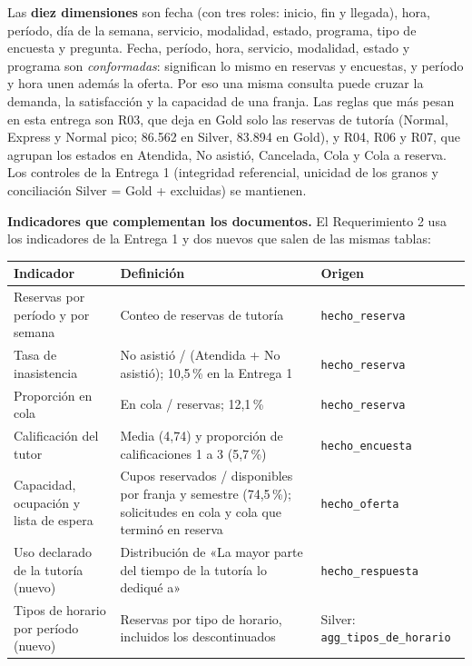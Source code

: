 \documentclass[11pt,letterpaper]{article}
\newcommand{\cod}[1]{\texttt{\small #1}}
\begin{document}
Las \textbf{diez dimensiones} son fecha (con tres roles: inicio, fin y llegada), hora, período, día de la semana, servicio, modalidad, estado, programa, tipo de encuesta y pregunta. Fecha, período, hora, servicio, modalidad, estado y programa son \emph{conformadas}: significan lo mismo en reservas y encuestas, y período y hora unen además la oferta. Por eso una misma consulta puede cruzar la demanda, la satisfacción y la capacidad de una franja. Las reglas que más pesan en esta entrega son R03, que deja en Gold solo las reservas de tutoría (Normal, Express y Normal pico; 86.562 en Silver, 83.894 en Gold), y R04, R06 y R07, que agrupan los estados en Atendida, No asistió, Cancelada, Cola y Cola a reserva. Los controles de la Entrega 1 (integridad referencial, unicidad de los granos y conciliación Silver = Gold + excluidas) se mantienen.

\textbf{Indicadores que complementan los documentos.} El Requerimiento 2 usa los indicadores de la Entrega 1 y dos nuevos que salen de las mismas tablas:

\begin{table}[H]\small\renewcommand{\arraystretch}{1.15}
\begin{tabularx}{\textwidth}{>{\raggedright\arraybackslash}p{}L>{\raggedright\arraybackslash}p{0.2\textwidth}}
\toprule
\textbf{Indicador} & \textbf{Definición} & \textbf{Origen} \\
\midrule
Reservas por período y por semana & Conteo de reservas de tutoría & \cod{hecho\_reserva} \\
Tasa de inasistencia & No asistió / (Atendida + No asistió); 10,5\,\% en la Entrega 1 & \cod{hecho\_reserva} \\
Proporción en cola & En cola / reservas; 12,1\,\% & \cod{hecho\_reserva} \\
Calificación del tutor & Media (4,74) y proporción de calificaciones 1 a 3 (5,7\,\%) & \cod{hecho\_encuesta} \\
Capacidad, ocupación y lista de espera & Cupos reservados / disponibles por franja y semestre (74,5\,\%); solicitudes en cola y cola que terminó en reserva & \cod{hecho\_oferta} \\
Uso declarado de la tutoría (nuevo) & Distribución de «La mayor parte del tiempo de la tutoría lo dediqué a» & \cod{hecho\_respuesta} \\
Tipos de horario por período (nuevo) & Reservas por tipo de horario, incluidos los descontinuados & Silver: \cod{agg\_tipos\_\allowbreak{}de\_\allowbreak{}horario} \\
\bottomrule
\end{tabularx}
\end{table}
\end{document}
